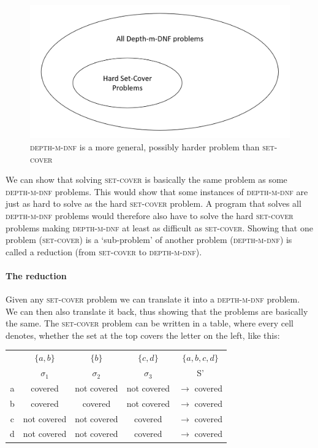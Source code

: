 \documentclass{article}
\begin{document}
\begin{figure}[h]
    \centering
    \includegraphics[width=0.5\linewidth]{grafik.png}
    \caption{\textsc{depth-m-dnf} is a more general, possibly harder problem than \textsc{set-cover}}
    \label{fig:enter-label}
\end{figure}

We can show that solving \textsc{set-cover} is basically the same problem as some \textsc{depth-m-dnf} problems. This would show that some instances of \textsc{depth-m-dnf} are just as hard to solve as the hard \textsc{set-cover} problem. A program that solves all \textsc{depth-m-dnf} problems would therefore also have to solve the hard \textsc{set-cover} problems making \textsc{depth-m-dnf} at least as difficult as \textsc{set-cover}. Showing that one problem (\textsc{set-cover}) is a `sub-problem' of another problem (\textsc{depth-m-dnf}) is called a reduction (from \textsc{set-cover} to \textsc{depth-m-dnf}).

\paragraph{The reduction}

Given any \textsc{set-cover} problem we can translate it into a \textsc{depth-m-dnf} problem. We can then also translate it back, thus showing that the problems are basically the same. The \textsc{set-cover} problem can be written in a table, where every cell denotes, whether the set at the top covers the letter on the left, like this:

\begin{center}
    \begin{tabular}{c || c c c | c}
          & $\{a, b\}$ & $\{b\}$ & $\{c, d\}$ & $\{a, b, c, d\}$ \\
          & $\sigma_1$ & $\sigma_2$ & $\sigma_3$ & S' \\
        \hline
        \hline
        a & covered & not covered & not covered & $\rightarrow$ covered \\
        b & covered & covered & not covered & $\rightarrow$ covered \\
        c & not covered & not covered & covered & $\rightarrow$ covered \\
        d & not covered & not covered & covered & $\rightarrow$ covered
    \end{tabular}
\end{center}
\end{document}
